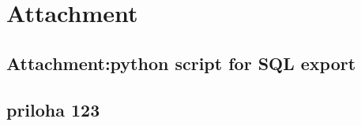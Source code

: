 \documentclass[a4paper,12pt,oneside]{report}
\renewcommand*\thesection{\arabic{section}}
\begin{document}
\setcounter{footnote}{1}
\newpage

\appendix
\chapter*{Attachment}
\renewcommand\thesection{\Alph{section}}

\section{Attachment:python script for SQL export}
\section{priloha 123}
\end{document}

